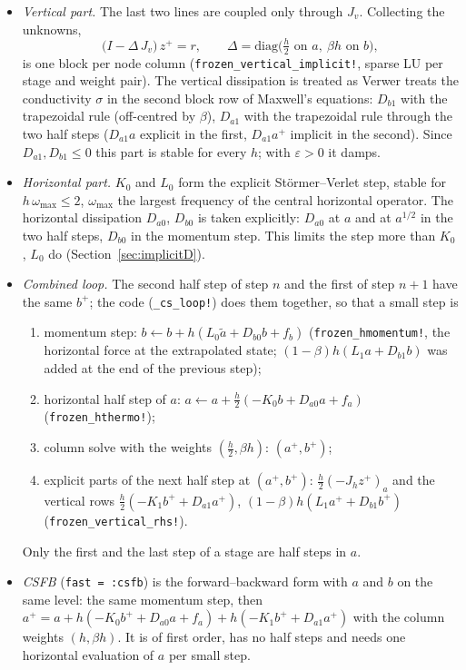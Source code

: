 \documentclass[11pt,a4paper]{article}
\newcommand{\code}[1]{\texttt{#1}}
\begin{document}
\begin{itemize}
\item \emph{Vertical part.} The last two lines are coupled only through $J_v$. Collecting the unknowns,
  \[
  \big(I-\Delta\,J_v\big)\,z^+=r,\qquad \Delta=\mathrm{diag}\big(\tfrac h2\text{ on }a,\ \beta h\text{ on }b\big),
  \]
  is one block per node column (\code{frozen\_vertical\_implicit!}, sparse LU per stage and weight pair). The vertical
  dissipation is treated as Verwer treats the conductivity $\sigma$ in the second block row of Maxwell's equations: $D_{b1}$
  with the trapezoidal rule (off-centred by $\beta$), $D_{a1}$ with the trapezoidal rule through the two half steps
  ($D_{a1}a$ explicit in the first, $D_{a1}a^+$ implicit in the second). Since $D_{a1},D_{b1}\le0$ this part is stable for every
  $h$; with $\varepsilon>0$ it damps.
\item \emph{Horizontal part.} $K_0$ and $L_0$ form the explicit Störmer--Verlet step, stable for $h\,\omega_{\max}\le2$, $\omega_{\max}$
  the largest frequency of the central horizontal operator. The horizontal dissipation $D_{a0}$, $D_{b0}$ is taken
  explicitly: $D_{a0}$ at $a$ and at $a^{1/2}$ in the two half steps, $D_{b0}$ in the momentum step. This limits the step more
  than $K_0$, $L_0$ do (Section~\ref{sec:implicitD}).
\item \emph{Combined loop.} The second half step of step $n$ and the first of step $n+1$ have the same $b^+$; the code
  (\code{\_cs\_loop!}) does them together, so that a small step is
  \begin{enumerate}
  \item momentum step: $b\leftarrow b+h(L_0\tilde a+D_{b0}b+f_b)$ (\code{frozen\_hmomentum!}, the horizontal force at the
    extrapolated state; $(1-\beta)h(L_1a+D_{b1}b)$ was added at the end of the previous step);
  \item horizontal half step of $a$: $a\leftarrow a+\tfrac h2(-K_0b+D_{a0}a+f_a)$ (\code{frozen\_hthermo!});
  \item column solve with the weights $(\tfrac h2,\beta h)$: $(a^+,b^+)$;
  \item explicit parts of the next half step at $(a^+,b^+)$: $\tfrac h2(-J_hz^+)_a$ and the vertical rows $\tfrac h2(-K_1b^++D_{a1}a^+)$,
    $(1-\beta)h(L_1a^++D_{b1}b^+)$ (\code{frozen\_vertical\_rhs!}).
  \end{enumerate}
  Only the first and the last step of a stage are half steps in $a$.
\item \emph{CSFB} (\code{fast = :csfb}) is the forward--backward form with $a$ and $b$ on the same level: the same momentum step,
  then $a^+=a+h(-K_0b^++D_{a0}a+f_a)+h(-K_1b^++D_{a1}a^+)$ with the column weights $(h,\beta h)$. It is of first order, has
  no half steps and needs one horizontal evaluation of $a$ per small step.
\end{itemize}
\end{document}
